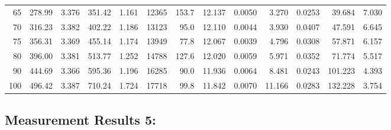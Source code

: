 \documentclass[10pt]{article}
\begin{document}
{\begin{tabular}{|r|rr|rr|rr|rr|rr|r|r|}
       65 &       278.99 &        3.376 &       351.42 &        1.161 &        12365 &        153.7 &       12.137 &       0.0050 &        3.270 &       0.0253 &       39.684 &        7.030 \\
       70 &       316.23 &        3.382 &       402.22 &        1.186 &        13123 &         95.0 &       12.110 &       0.0044 &        3.930 &       0.0407 &       47.591 &        6.645 \\
       75 &       356.31 &        3.369 &       455.14 &        1.174 &        13949 &         77.8 &       12.067 &       0.0039 &        4.796 &       0.0308 &       57.871 &        6.157 \\
       80 &       396.00 &        3.381 &       513.77 &        1.252 &        14788 &        127.6 &       12.020 &       0.0059 &        5.971 &       0.0352 &       71.774 &        5.517 \\
       90 &       444.69 &        3.366 &       595.36 &        1.196 &        16285 &         90.0 &       11.936 &       0.0064 &        8.481 &       0.0243 &      101.223 &        4.393 \\
      100 &       496.42 &        3.387 &       710.24 &        1.724 &        17718 &         99.8 &       11.842 &       0.0070 &       11.166 &       0.0283 &      132.228 &        3.754 \\
\hline
\end{tabular}
}



\subsection*{\large \bf Measurement Results 5:}
\end{document}
